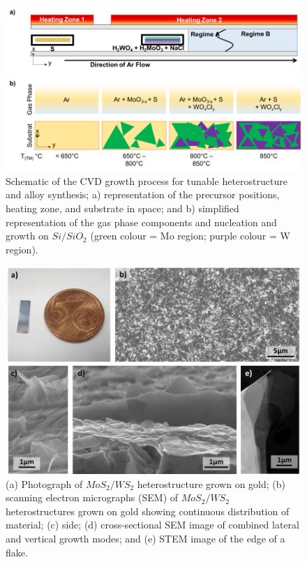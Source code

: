\begin{figure}[h]
	\begin{center}
		\includegraphics[scale=0.5]{Heterostructures/CVDGrowthSetup.png}
		\caption{Schematic of the CVD growth process for tunable heterostructure and alloy synthesis; a) representation of the precursor positions, heating zone, and substrate in space; and b) simplified representation of the gas phase components and nucleation and growth on $Si/SiO_2$ (green colour = Mo region;  purple colour = W region).}
		\label{fig:HeterostructureCVDGrowthSetup}
	\end{center}
\end{figure}

\begin{figure}[h]
	\begin{center}
		\includegraphics[scale=0.4]{Heterostructures/SEMImages.png}
		\caption{(a) Photograph of $MoS_2/WS_2$ heterostructure grown on gold; (b) scanning electron micrographs (SEM) of $MoS_2/WS_2$ heterostructures grown on gold showing continuous distribution of material; (c) side; (d) cross-sectional SEM image of combined lateral and vertical growth modes; and (e) STEM image of the edge of a flake.}
		\label{fig:HeterostructureSEMImages}
	\end{center}
\end{figure}

